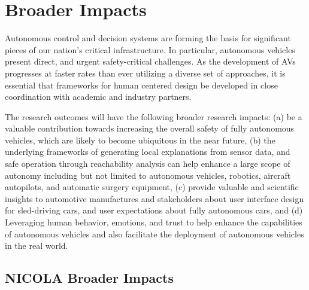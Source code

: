 

\section{Broader Impacts}
\label{sec:broader}

Autonomous control and decision systems are forming the basis for significant pieces of our nation’s critical infrastructure. In particular, autonomous vehicles present direct, and urgent safety-critical challenges. 
As the development of AVs progresses at faster rates than ever utilizing a diverse set of approaches, it is essential that frameworks for human centered design be developed in close coordination with academic and industry partners. 

The research outcomes will have the following broader research impacts: (a) be a valuable contribution towards increasing the overall safety of fully autonomous vehicles, which are likely to become ubiquitous in the near future, (b) the underlying frameworks of generating local explanations from sensor data, and safe operation through reachability analysis can help enhance a large scope of autonomy including but not limited to autonomous vehicles, robotics, aircraft autopilots, and automatic surgery equipment, 
(c) provide valuable and scientific insights to automotive manufactures and stakeholders about user interface design for sled-driving cars, and user expectations about fully autonomous cars, and (d) Leveraging human behavior, emotions, and trust to help enhance the capabilities of autonomous vehicles and also facilitate the deployment of autonomous vehicles in the real world.


\subsection{NICOLA Broader Impacts}
\vspace{-5pt}



